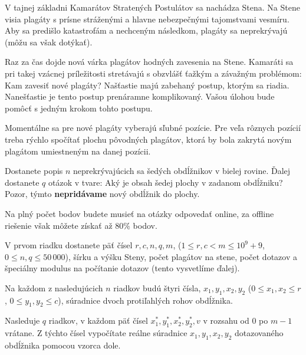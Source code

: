 
\usepackage[slovak]{babel}





V tajnej základni Kamarátov Stratených Postulátov sa nachádza Stena. Na Stene
visia plagáty s prísne stráženými a hlavne nebezpečnými tajomstvami vesmíru.
Aby sa predišlo katastrofám a nechceným následkom, plagáty sa neprekrývajú
(môžu sa však dotýkať).

Raz za čas dojde nová várka plagátov hodných zavesenia na Stene. Kamaráti sa
pri takej vzácnej príležitosti stretávajú s obzvlášť ťažkým a závažným problémom:
Kam zavesiť nové plagáty? Našťastie majú zabehaný postup, ktorým sa riadia. Nanešťastie
je tento postup prenáramne komplikovaný. Vašou úlohou bude pomôcť s jedným krokom
tohto postupu.

Momentálne sa pre nové plagáty vyberajú sľubné pozície. Pre veľa rôznych pozícií treba rýchlo 
spočítať plochu pôvodných plagátov, ktorá by bola zakrytá novým plagátom umiestneným na
danej pozícii.


Dostanete popis $n$ neprekrývajúcich sa šedých obdĺžnikov v bielej rovine. Ďalej dostanete $q$
otázok v tvare: Aký je obsah šedej plochy v zadanom obdĺžniku? Pozor,
týmto \textbf{nepridávame} nový obdĺžnik do plochy.

Na plný počet bodov budete musieť na otázky odpovedať online, za offline riešenie však môžete
získať až $80\%$ bodov.


V prvom riadku dostanete päť čísel $r, c, n, q, m$, ($1 \leq r, c < m \leq 10^9 + 9$, $0 \leq n,q \leq 50\,000$),
šírku a výšku Steny, počet plagátov na stene, počet dotazov a špeciálny modulus
na počítanie dotazov (tento vysvetlíme ďalej).

Na každom z nasledujúcich $n$ riadkov budú štyri čísla, $x_1, y_1, x_2, y_2$ ($0 \leq x_1, x_2 \leq r$,
$0 \leq y_1, y_2 \leq c$), súradnice dvoch protiľahlých rohov obdĺžnika.

Nasleduje $q$ riadkov, v každom päť čísel $x_1^*, y_1^*, x_2^*, y_2^*, v$ v rozsahu od
$0$ po $m - 1$ vrátane. Z týchto čísel vypočítate reálne súradnice $x_1, y_1, x_2, y_2$
dotazovaného obdĺžnika pomocou vzorca dole.

